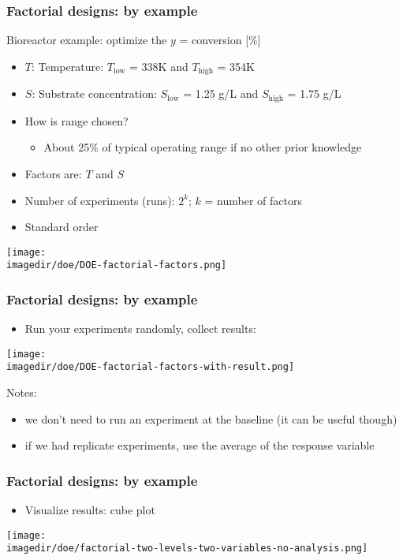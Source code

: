 \begin{frame}\frametitle{Factorial designs: by example}

	Bioreactor example: optimize the $y$ = conversion [\%]
	\begin{itemize}
		\item	$T$: Temperature: $T_\text{low}$ = 338K and $T_\text{high}$ = 354K
		\item	$S$: Substrate concentration: $S_\text{low}$ = 1.25 g/L and $S_\text{high}$ = 1.75 g/L
		\item	How is range chosen?
		\begin{itemize}
			\item	About 25\% of typical operating range if no other prior knowledge
		\end{itemize}
	\end{itemize}
	\begin{itemize}
		\item	Factors are: $T$ and $S$
		\item	Number of experiments (runs): $2^k$; $k$ = number of factors
		\item	Standard order
	\end{itemize}
	\begin{center}
		\texttt{[image: \\imagedir/doe/DOE-factorial-factors.png]}
	\end{center}
\end{frame}

\begin{frame}\frametitle{Factorial designs: by example}
	\begin{itemize}
		\item	Run your experiments randomly, collect results:
	\end{itemize}
	\begin{center}
		\texttt{[image: \\imagedir/doe/DOE-factorial-factors-with-result.png]}
	\end{center}
	Notes:
	\begin{itemize}
		\item	we don't need to run an experiment at the baseline (it can be useful though)
		\item	if we had replicate experiments, use the average of the response variable
	\end{itemize}
\end{frame}

\begin{frame}\frametitle{Factorial designs: by example}
	\begin{itemize}
		\item	Visualize results: cube plot
	\end{itemize}
	\begin{center}
		\texttt{[image: \\imagedir/doe/factorial-two-levels-two-variables-no-analysis.png]}
	\end{center}
\end{frame}

